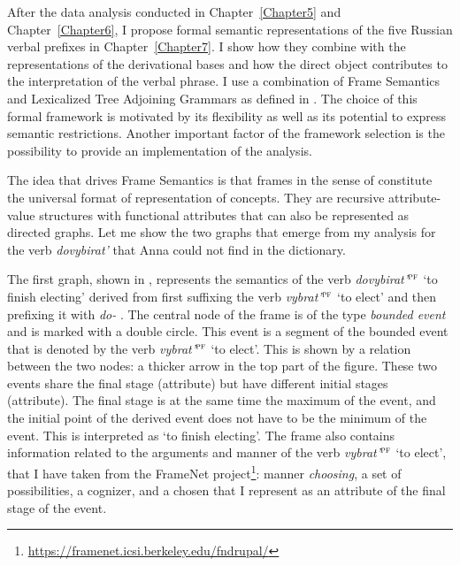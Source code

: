 After the data analysis conducted in Chapter~\ref{Chapter5} and Chapter~\ref{Chapter6}, I propose formal semantic representations of the five Russian verbal prefixes in Chapter~\ref{Chapter7}. I show how they combine with the representations of the derivational bases and how the direct object contributes to the interpretation of the verbal phrase. I use a combination of Frame Semantics and Lexicalized Tree Adjoining Grammars as defined in \citealt{KallmeyerOsswald:13}. The choice of this formal framework is motivated by its flexibility as well as its potential to express semantic restrictions. Another important factor of the framework selection is the possibility to provide an implementation of the analysis. 

The idea that drives Frame Semantics \citep{Loebner:2014} is that frames in the sense of \citet{Barsalou:92} constitute the universal format of representation of concepts. They are recursive attribute-value structures with functional attributes that can also be represented as directed graphs. Let me show the two graphs that emerge from my analysis for the verb \textit{dovybirat'} that Anna could not find in the dictionary.

The first graph, shown in , represents the semantics of the verb \textit{dovybirat'}$^{\textsc{pf}}$ `to finish electing' derived from first suffixing the verb \textit{vybrat'}$^{\textsc{pf}}$ `to elect' and then prefixing it with \textit{do-}  . The central node of the frame is of the type \textit{bounded event} and is marked with a double circle. This event is a segment of the bounded event that is denoted by the verb \textit{vybrat'}$^{\textsc{pf}}$ `to elect'. This is shown by a relation between the two nodes: a thicker arrow in the top part of the figure. These two events share the final stage (\FIN attribute) but have different initial stages (\INIT attribute). The final stage is at the same time the maximum of the event, and the initial point of the derived event does not have to be the minimum of the event. This is interpreted as `to finish electing'. The frame also contains information related to the arguments and manner of the verb \textit{vybrat'}$^{\textsc{pf}}$ `to elect', that I have taken from the FrameNet project\footnote{\url{https://framenet.icsi.berkeley.edu/fndrupal/}}: manner \textit{choosing}, a set of possibilities, a cognizer, and a chosen that I represent as an attribute of the final stage of the event.

